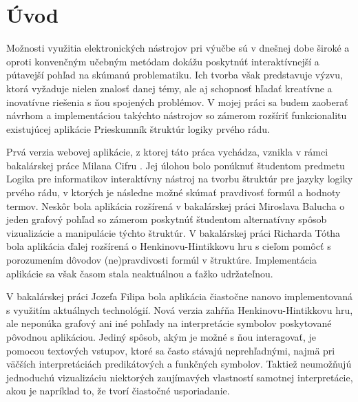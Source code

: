 \chapter*{Úvod} %

Možnosti využitia elektronických nástrojov pri výučbe sú v dnešnej dobe široké a oproti konvenčným učebným metódam dokážu poskytnúť interaktívnejší a pútavejší pohľad na skúmanú problematiku. Ich tvorba však predstavuje výzvu, ktorá vyžaduje nielen znalosť danej témy, ale aj schopnosť hľadať kreatívne a inovatívne riešenia s ňou spojených problémov. V mojej práci sa budem zaoberať návrhom a implementáciou takýchto nástrojov so zámerom rozšíriť funkcionalitu existujúcej aplikácie Prieskumník štruktúr logiky prvého rádu.

Prvá verzia webovej aplikácie, z ktorej táto práca vychádza, vznikla v rámci bakalárskej práce Milana Cifru \cite{cifra2018}. Jej úlohou bolo ponúknuť študentom predmetu Logika pre informatikov interaktívny nástroj na tvorbu štruktúr pre jazyky logiky prvého rádu, v ktorých je následne možné skúmať pravdivosť formúl a hodnoty termov.
Neskôr bola aplikácia rozšírená v bakalárskej práci Miroslava Balucha \cite{baluch2020} o jeden grafový pohľad so zámerom poskytnúť študentom alternatívny spôsob vizualizácie a manipulácie týchto štruktúr. V bakalárskej práci Richarda Tótha \cite{toth2021} bola aplikácia ďalej rozšírená o Henkinovu-Hintikkovu hru s cieľom pomôcť s porozumením dôvodov (ne)pravdivosti formúl v štruktúre.
Implementácia aplikácie sa však časom stala neaktuálnou a ťažko udržateľnou.

V bakalárskej práci Jozefa Filipa \cite{filip2025} bola aplikácia čiastočne nanovo implementovaná s využitím aktuálnych technológií. Nová verzia zahŕňa Henkinovu-Hintikkovu hru, ale neponúka grafový ani iné pohľady na interpretácie symbolov poskytované pôvodnou aplikáciou. Jediný spôsob, akým je možné s ňou interagovať, je pomocou textových vstupov, ktoré sa často stávajú neprehľadnými, najmä pri väčších interpretáciách predikátových a funkčných symbolov. Taktiež neumožňujú jednoduchú vizualizáciu niektorých zaujímavých vlastností samotnej interpretácie, akou je napríklad to, že tvorí čiastočné usporiadanie.



